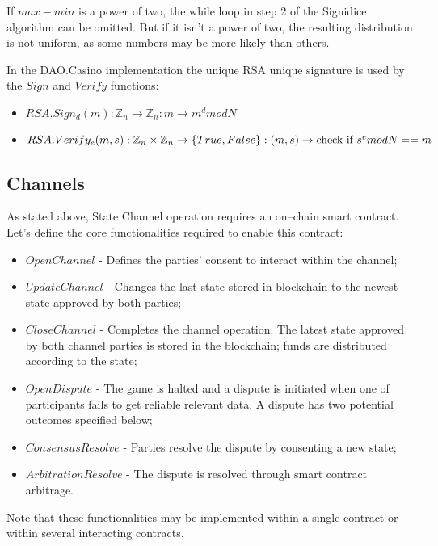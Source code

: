 \begin{remark}
If  $max -  min$ is a power of two, the while loop in step 2 of the Signidice algorithm can be omitted. But if it isn't a power of two, the resulting distribution is not uniform, as some numbers may be more likely than others.
\end{remark}

In the DAO.Casino implementation the unique RSA unique signature is used by the $Sign$ and $Verify$ functions:
\begin{itemize}
	\item $RSA.Sign_d(m): \mathbb{Z}_n \rightarrow \mathbb{Z}_n: m \rightarrow m^d mod N$
	\item $RSA.Verify_e(m, s): \mathbb{Z}_n \times \mathbb{Z}_n \rightarrow \{True, False\}: (m, s) \rightarrow \text{check if } \\ s^e mod N == m $
\end{itemize}

	\subsection{Channels}
As stated above, State Channel operation requires an on--chain smart contract. Let’s define the core functionalities required to enable this contract:
\begin{itemize}
	\item $ OpenChannel $ - Defines the parties’ consent to interact within the channel;
	\item $ UpdateChannel $ - Changes the last state stored in blockchain to the newest state approved by both parties;
	\item $ CloseChannel $ - Completes the channel operation. The latest state approved by both channel parties is stored in the blockchain; funds are distributed according to the state;
	\item $ OpenDispute $ - The game is halted and a dispute is initiated when one of participants fails to get reliable relevant data. A dispute has two potential outcomes specified below;
	\item $ ConsensusResolve $ - Parties resolve the dispute by consenting a new state;
	\item $ ArbitrationResolve $ - The dispute is resolved through smart contract arbitrage.
\end{itemize}

\begin{remark}
Note that these functionalities may be implemented within a single contract or within several interacting contracts.
\end{remark}

